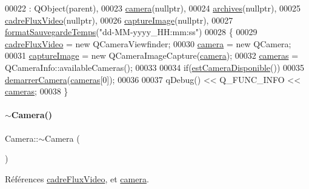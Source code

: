 \begin{DoxyCode}
00022                               : QObject(parent),
00023   \hyperlink{class_camera_a282a199ddd33fe64bc27b32a55719054}{camera}(\textcolor{keyword}{nullptr}),
00024   \hyperlink{class_camera_a5eb3a29aeeab2f2755d0b69ac7cf550a}{archives}(\textcolor{keyword}{nullptr}),
00025   \hyperlink{class_camera_abf5fd38d19f0f06dfd7ec9e37f73adb8}{cadreFluxVideo}(\textcolor{keyword}{nullptr}),
00026   \hyperlink{class_camera_a482276c4fd0ba7172670006556322b62}{captureImage}(\textcolor{keyword}{nullptr}),
00027   \hyperlink{class_camera_a1056fa6cffd2914d9e5a171bebf5ba7e}{formatSauvegardeTemps}(\textcolor{stringliteral}{"dd-MM-yyyy\_HH:mm:ss"})
00028 \{
00029     \hyperlink{class_camera_abf5fd38d19f0f06dfd7ec9e37f73adb8}{cadreFluxVideo} = \textcolor{keyword}{new} QCameraViewfinder;
00030     \hyperlink{class_camera_a282a199ddd33fe64bc27b32a55719054}{camera} = \textcolor{keyword}{new} QCamera;
00031     \hyperlink{class_camera_a482276c4fd0ba7172670006556322b62}{captureImage} = \textcolor{keyword}{new} QCameraImageCapture(\hyperlink{class_camera_a282a199ddd33fe64bc27b32a55719054}{camera});
00032     \hyperlink{class_camera_a3bea5177e857533a53cb94135bee8c6b}{cameras} = QCameraInfo::availableCameras();
00033 
00034     \textcolor{keywordflow}{if}(\hyperlink{class_camera_afb73ab859802a143a1a00443e396143e}{estCameraDisponible}())
00035         \hyperlink{class_camera_a181773c87c3deaea9fa9844f8ac294e3}{demarrerCamera}(\hyperlink{class_camera_a3bea5177e857533a53cb94135bee8c6b}{cameras}[0]);
00036 
00037     qDebug() << Q\_FUNC\_INFO << \hyperlink{class_camera_a3bea5177e857533a53cb94135bee8c6b}{cameras};
00038 \}
\end{DoxyCode}
\mbox{\label{class_camera_ad1897942d0ccf91052386388a497349f}} 
\paragraph{\texorpdfstring{$\sim$\+Camera()}{~Camera()}}
{\footnotesize\ttfamily Camera\+::$\sim$\+Camera (\begin{DoxyParamCaption}{ }\end{DoxyParamCaption})}



Références \hyperlink{class_camera_abf5fd38d19f0f06dfd7ec9e37f73adb8}{cadre\+Flux\+Video}, et \hyperlink{class_camera_a282a199ddd33fe64bc27b32a55719054}{camera}.


